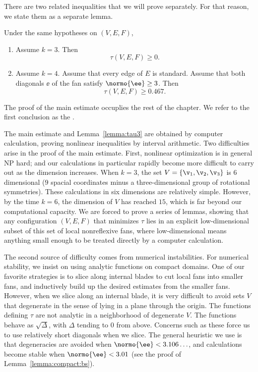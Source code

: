 There are two related inequalities that we will prove separately. For that reason,
we state them as a separate lemma.

\begin{lemma}\label{lemma:tau3}
Under the same hypotheses on $(V,E,F)$, 
\begin{enumerate}
\item Assume $k=3$. Then
\[\tau(V,E,F)\ge 0.\]
\item Assume $k=4$.  Assume that every edge of $E$ is standard.
Assume that both diagonals $\ee$ of the fan satisfy $\normo{\ee}\ge3$.
Then
\[
\tau(V,E,F)\ge 0.467.
\]
\end{enumerate}
\end{lemma}

The proof of the main estimate occuplies the rest of the chapter.
We refer to the first conclusion as the .  

The main estimate and Lemma~\ref{lemma:tau3} are obtained by computer
calculation, proving nonlinear inequalities by interval arithmetic.
Two  difficulties
arise in the proof of  the main estimate.  First, nonlinear optimization is
in general NP hard; and our calculations in particular rapidly become
more difficult to carry out as the dimension increases.  When $k=3$,
the set $V=\{\v_1,\v_2,\v_3\}$ is $6$ dimensional ($9$ spacial
coordinates minus a three-dimensional group of rotational symmetries).
These calculations in six dimensions are relatively simple.  However,
by the time $k=6$, the dimension of $V$ has reached $15$, which is far
beyond our computational capacity.  We are forced to prove a series of
lemmas, showing that any configuration $(V,E,F)$ that minimizes $\tau$
lies in an explicit low-dimensional subset of this set of local
nonreflexive fans, where low-dimensional means anything small enough
to be treated directly by a computer calculation.

The second source of difficulty comes from numerical instabilities.
For numerical stability, we insist on using analytic functions on
compact domains.  One of our favorite strategies is to slice along
internal blades to cut local fans into smaller fans, and inductively
build up the desired estimates from the smaller fans.  However, when
we slice along an internal blade, it is very difficult to avoid sets
$V$ that degenerate in the sense of lying in a plane through the
origin.  The functions defining $\tau$ are not analytic in a
neighborhood of degenerate $V$.  The functions behave as
$\sqrt{\Delta}$, with $\Delta$ tending to $0$ from above.  Concerns
such as these force us to use relatively short diagonals when we
slice.  The general heuristic we use is that degeneracies are avoided when
$\normo{\ee}< 3.106\ldots$, and calculations become stable
when $\normo{\ee}<3.01$  (see the proof of
Lemma~\ref{lemma:compact:bs}).

